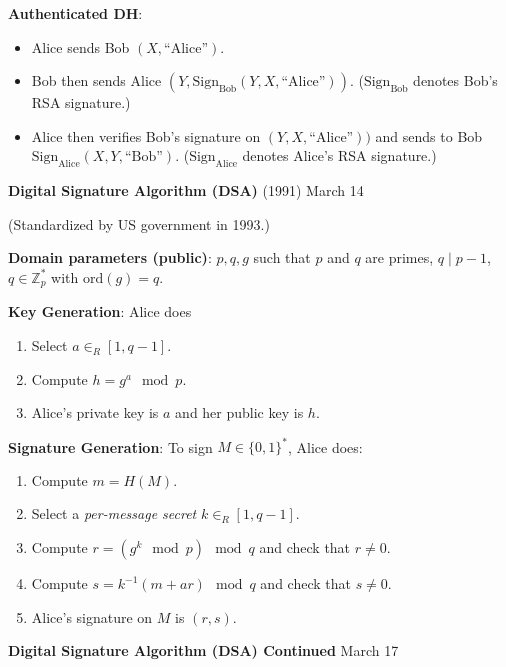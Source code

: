 \documentclass[a4paper,12pt]{article}
\begin{document}
{\bf Authenticated DH}:
\begin{itemize}
\item Alice sends Bob $(X,\text{``Alice''})$.
\item Bob then sends Alice $(Y, \text{Sign}_\text{Bob}(Y,X,\text{``Alice''}))$. ($\text{Sign}_\text{Bob}$ denotes Bob's RSA signature.)
\item Alice then verifies Bob's signature on $(Y,X,\text{``Alice''}))$ and sends to Bob \\$\text{Sign}_\text{Alice}(X,Y,\text{``Bob''})$. ($\text{Sign}_\text{Alice}$ denotes Alice's RSA signature.)
\end{itemize}

\clearpage
{\bf Digital Signature Algorithm (DSA)} (1991)
\hfill
March 14

(Standardized by US government in 1993.)

{\bf Domain parameters (public)}: $p,q,g$ such that $p$ and $q$ are primes, $q \mid p-1$, $q \in \mathbb{Z}_p^*$ with $\text{ord}(g) = q$.

{\bf Key Generation}: Alice does
\begin{enumerate}[1.]
\item Select $a \in_R [1,q-1]$.
\item Compute $h = g^a \mod p$.
\item Alice's private key is $a$ and her public key is $h$.
\end{enumerate}

{\bf Signature Generation}: To sign $M \in \{0,1\}^*$, Alice does:
\begin{enumerate}[1.]
\item Compute $m = H(M)$.
\item Select a {\em per-message secret} $k \in_R [1,q-1]$.
\item Compute $r = (g^k \mod p) \mod q$ and check that $r \ne 0$.
\item Compute $s = k^{-1}(m+ar) \mod q$ and check that $s \ne 0$.
\item Alice's signature on $M$ is $(r,s)$.
\end{enumerate}


\clearpage
{\bf Digital Signature Algorithm (DSA) Continued}
\hfill
March 17\\[0.5em]
\end{document}
